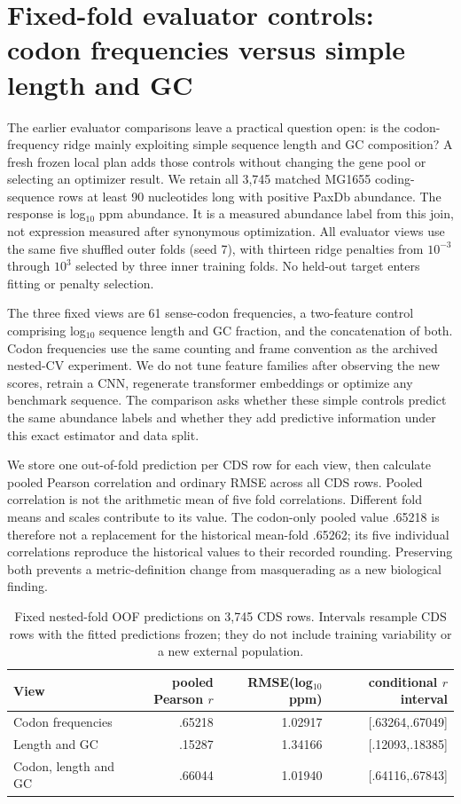 \section{Fixed-fold evaluator controls: codon frequencies versus simple length and GC}
The earlier evaluator comparisons leave a practical question open: is the codon-frequency ridge mainly exploiting simple sequence length and GC composition? A fresh frozen local plan adds those controls without changing the gene pool or selecting an optimizer result. We retain all 3,745 matched MG1655 coding-sequence rows at least 90 nucleotides long with positive PaxDb abundance. The response is log$_{10}$ ppm abundance. It is a measured abundance label from this join, not expression measured after synonymous optimization. All evaluator views use the same five shuffled outer folds (seed 7), with thirteen ridge penalties from $10^{-3}$ through $10^3$ selected by three inner training folds. No held-out target enters fitting or penalty selection.

The three fixed views are 61 sense-codon frequencies, a two-feature control comprising log$_{10}$ sequence length and GC fraction, and the concatenation of both. Codon frequencies use the same counting and frame convention as the archived nested-CV experiment. We do not tune feature families after observing the new scores, retrain a CNN, regenerate transformer embeddings or optimize any benchmark sequence. The comparison asks whether these simple controls predict the same abundance labels and whether they add predictive information under this exact estimator and data split.

We store one out-of-fold prediction per CDS row for each view, then calculate pooled Pearson correlation and ordinary RMSE across all CDS rows. Pooled correlation is not the arithmetic mean of five fold correlations. Different fold means and scales contribute to its value. The codon-only pooled value .65218 is therefore not a replacement for the historical mean-fold .65262; its five individual correlations reproduce the historical values to their recorded rounding. Preserving both prevents a metric-definition change from masquerading as a new biological finding.

\begin{table}[ht]\centering\small
\caption{Fixed nested-fold OOF predictions on 3,745 CDS rows. Intervals resample CDS rows with the fitted predictions frozen; they do not include training variability or a new external population.}
\begin{tabular}{lrrr}\hline
View & pooled Pearson $r$ & RMSE(log$_{10}$ ppm) & conditional $r$ interval\\\hline
Codon frequencies & .65218 & 1.02917 & [.63264,.67049]\\
Length and GC & .15287 & 1.34166 & [.12093,.18385]\\
Codon, length and GC & .66044 & 1.01940 & [.64116,.67843]\\\hline
\end{tabular}\end{table}

